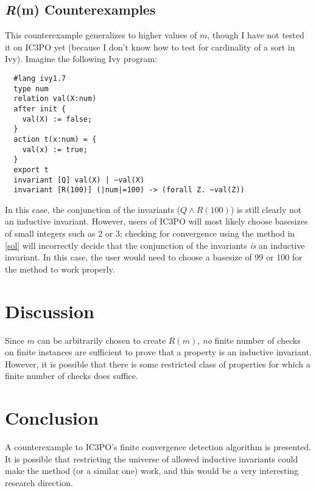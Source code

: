 \documentclass[12pt]{article}
\begin{document}
\subsection{\textit{R}(m) Counterexamples}
This counterexample generalizes to higher values of $m$, though I have not tested it on IC3PO yet (because I don't know how to test for cardinality of a sort in Ivy).  Imagine the following Ivy program:

\begin{verbatim}
  #lang ivy1.7
  type num
  relation val(X:num)
  after init {
    val(X) := false;
  }
  action t(x:num) = {
    val(x) := true;
  }
  export t
  invariant [Q] val(X) | ~val(X)
  invariant [R(100)] (|num|=100) -> (forall Z. ~val(Z))
\end{verbatim}

In this case, the conjunction of the invariants ($Q \land R(100)$) is still clearly not an inductive invariant.  However, users of IC3PO will most likely choose basesizes of small integers such as 2 or 3; checking for convergence using the method in \ref{sol} will incorrectly decide that the conjunction of the invariants \textit{is} an inductive invariant.  In this case, the user would need to choose a basesize of 99 or 100 for the method to work properly.

\section{Discussion}
Since $m$ can be arbitrarily chosen to create $R(m)$, \textit{no} finite number of checks on finite instances are sufficient to prove that a property is an inductive invariant.  However, it is possible that there is some restricted class of properties for which a finite number of checks does suffice.

\section{Conclusion}
A counterexample to IC3PO's finite convergence detection algorithm is presented.  It is possible that restricting the universe of allowed inductive invariants could make the method (or a similar one) work, and this would be a very interesting research direction.




\end{document}
